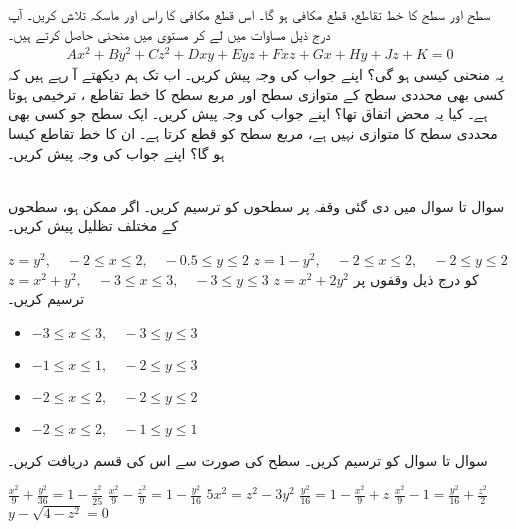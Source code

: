 سطح    اور سطح  کا خط تقاطع،  قطع مکافی ہو گا۔ اس قطع مکافی کا راس اور ماسکہ  تلاش کریں۔
آپ درج ذیل مساوات میں  لے کر مستوی  میں منحنی حاصل کرتے ہیں۔
\begin{align*}
Ax^2+By^2+Cz^2+Dxy+Eyz+Fxz+Gx+Hy+Jz+K=0
\end{align*}
یہ منحنی کیسی ہو گی؟ اپنے جواب کی وجہ پیش کریں۔
اب  تک  ہم دیکھتے آ رہے ہیں کہ کسی بھی محددی  سطح کے متوازی سطح اور مربع سطح کا خط تقاطع ،  ترخیمی ہوتا ہے۔ کیا یہ محض    اتفاق تھا؟ اپنے جواب  کی وجہ پیش کریں۔
ایک سطح جو کسی بھی محددی  سطح کا متوازی نہیں ہے، مربع سطح کو قطع کرتا ہے۔  ان کا خط تقاطع کیسا ہو گا؟ اپنے جواب کی وجہ پیش کریں۔

\\
سوال  تا سوال  میں دی گئی وقفہ پر سطحوں کو ترسیم کریں۔ اگر ممکن ہو، سطحوں کے مختلف تظلیل پیش کریں۔

$z=y^2,\quad -2\le x\le 2,\quad -0.5\le y\le 2$
$z=1-y^2,\quad -2\le x\le 2,\quad -2\le y\le 2$
$z=x^2+y^2,\quad -3\le x\le 3,\quad -3\le y\le 3$
$z=x^2+2y^2$
کو درج ذیل وقفوں پر ترسیم کریں۔
\begin{itemize}
\item
$-3\le x\le 3,\quad -3\le y\le 3$
\item
$-1\le x\le 1,\quad -2\le y\le 3$
\item
$-2\le x\le 2,\quad -2\le y\le 2$
\item
$-2\le x\le 2,\quad -1\le y\le 1$
\end{itemize}
سوال  تا سوال  کو ترسیم کریں۔ سطح کی صورت  سے  اس کی قسم دریافت کریں۔

$\frac{x^2}{9}+\frac{y^2}{36}=1-\frac{z^2}{25}$
$\frac{x^2}{9}-\frac{z^2}{9}=1-\frac{y^2}{16}$
$5x^2=z^2-3y^2$
$\frac{y^2}{16}=1-\frac{x^2}{9}+z$
$\frac{x^2}{9}-1=\frac{y^2}{16}+\frac{z^2}{2}$
$y-\sqrt{4-z^2}=0$

